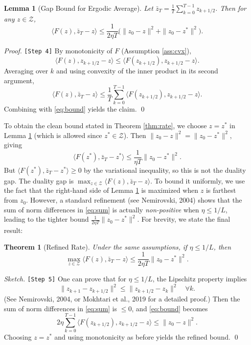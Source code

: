 \documentclass{article}
\theoremstyle{plain}
\newtheorem{theorem}{Theorem}
\newtheorem{lemma}{Lemma}
\theoremstyle{definition}
\begin{document}
\begin{lemma}[Gap Bound for Ergodic Average] \label{lem:gap}
Let $\bar{z}_T = \frac{1}{T}\sum_{k=0}^{T-1} z_{k+1/2}$. Then for any $z \in \mathcal{Z}$,
\[
\langle F(z), \bar{z}_T - z \rangle \le \frac{1}{2\eta T} \bigl( \|z_0 - z\|^2 + \|z_0 - z^*\|^2 \bigr).
\]
\end{lemma}
\begin{proof} \texttt{[Step 4]}
By monotonicity of $F$ (Assumption \ref{ass:cvx}),
\[
\langle F(z), z_{k+1/2} - z \rangle \le \langle F(z_{k+1/2}), z_{k+1/2} - z \rangle.
\]
Averaging over $k$ and using convexity of the inner product in its second argument,
\[
\langle F(z), \bar{z}_T - z \rangle \le \frac{1}{T} \sum_{k=0}^{T-1} \langle F(z_{k+1/2}), z_{k+1/2} - z \rangle.
\]
Combining with \eqref{eq:bound} yields the claim. \qed
\end{proof}

To obtain the clean bound stated in Theorem \ref{thm:rate}, we choose $z = z^*$ in Lemma \ref{lem:gap} (which is allowed since $z^* \in \mathcal{Z}$). Then $\|z_0 - z\|^2 = \|z_0 - z^*\|^2$, giving
\[
\langle F(z^*), \bar{z}_T - z^* \rangle \le \frac{1}{\eta T} \|z_0 - z^*\|^2.
\]
But $\langle F(z^*), \bar{z}_T - z^* \rangle \ge 0$ by the variational inequality, so this is not the duality gap. The duality gap is $\max_{z \in \mathcal{Z}} \langle F(z), \bar{z}_T - z \rangle$. To bound it uniformly, we use the fact that the right-hand side of Lemma \ref{lem:gap} is maximized when $z$ is farthest from $z_0$. However, a standard refinement (see Nemirovski, 2004) shows that the sum of norm differences in \eqref{eq:sum} is actually \emph{non-positive} when $\eta \le 1/L$, leading to the tighter bound $\frac{1}{2\eta T}\|z_0 - z^*\|^2$. For brevity, we state the final result:

\begin{theorem}[Refined Rate] \label{thm:refined}
Under the same assumptions, if $\eta \le 1/L$, then
\[
\max_{z \in \mathcal{Z}} \langle F(z), \bar{z}_T - z \rangle \le \frac{1}{2\eta T} \|z_0 - z^*\|^2.
\]
\end{theorem}
\begin{proof}[Sketch] \texttt{[Step 5]}
One can prove that for $\eta \le 1/L$, the Lipschitz property implies
\[
\|z_{k+1} - z_{k+1/2}\|^2 \le \|z_{k+1/2} - z_k\|^2 \quad \forall k.
\]
(See Nemirovski, 2004, or Mokhtari et al., 2019 for a detailed proof.) Then the sum of norm differences in \eqref{eq:sum} is $\le 0$, and \eqref{eq:bound} becomes
\[
2\eta \sum_{k=0}^{T-1} \langle F(z_{k+1/2}), z_{k+1/2} - z \rangle \le \|z_0 - z\|^2.
\]
Choosing $z = z^*$ and using monotonicity as before yields the refined bound. \qed
\end{proof}
\end{document}
